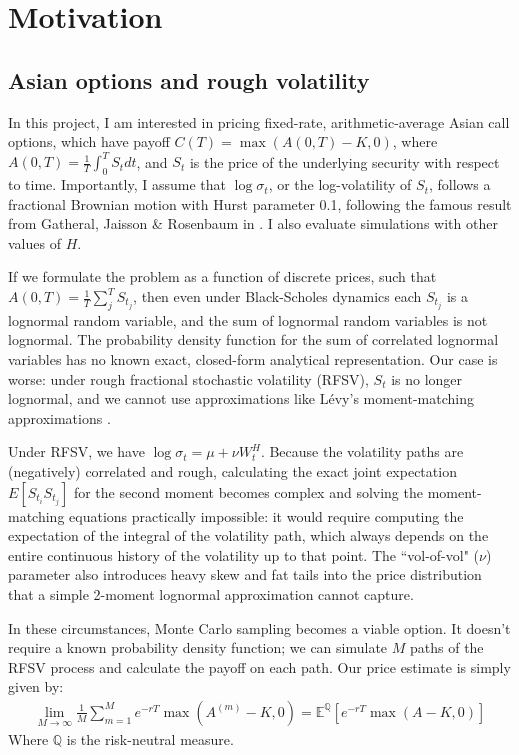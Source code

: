   \section{Motivation}

  \subsection{Asian options and rough volatility}
  In this project, I am interested in pricing fixed-rate, arithmetic-average Asian call options, which have payoff $C(T) = \max (A(0,T)-K,0)$, where $A(0,T) = \frac 1 T \int^T_0 S_tdt$, and $S_t$ is the price of the underlying security with respect to time. Importantly, I assume that $\log \sigma_t$, or the log-volatility of $S_t$, follows a fractional Brownian motion with Hurst parameter 0.1, following the famous result from Gatheral, Jaisson \& Rosenbaum in \cite{gatheral2018volatility}. I also evaluate simulations with other values of $H$.

  If we formulate the problem as a function of discrete prices, such that $A(0,T) = \frac 1 T \sum^T_j S_{t_j}$, then even under Black-Scholes dynamics each $S_{t_j}$ is a lognormal random variable, and the sum of lognormal random variables is not lognormal. The probability density function for the sum of correlated lognormal variables has no known exact, closed-form analytical representation. Our case is worse: under rough fractional stochastic volatility (RFSV), $S_t$ is no longer lognormal, and we cannot use approximations like L\'{e}vy's moment-matching approximations \cite{levy1992pricing}.

 Under RFSV, we have $\log \sigma_t = \mu + \nu W^H_t$. Because the volatility paths are (negatively) correlated and rough, calculating the exact joint expectation $E[S_{t_i} S_{t_j}]$ for the second moment becomes complex and solving the moment-matching equations practically impossible: it would require computing the expectation of the integral of the volatility path, which always depends on the entire continuous history of the volatility up to that point. The ``vol-of-vol" ($\nu$) parameter also introduces heavy skew and fat tails into the price distribution that a simple 2-moment lognormal approximation cannot capture.

 In these circumstances, Monte Carlo sampling becomes a viable option. It doesn't require a known probability density function; we can simulate $M$ paths of the RFSV process and calculate the payoff on each path. Our price estimate is simply given by:
 \begin{align}
    \lim_{M \to \infty} \frac{1}{M} \sum_{m=1}^M e^{-rT} \max\left(A^{(m)} - K, 0\right) = \mathbb{E}^{\mathbb{Q}}\left[e^{-rT} \max(A - K, 0)\right]
 \end{align}
    Where $\mathbb Q$ is the risk-neutral measure.

